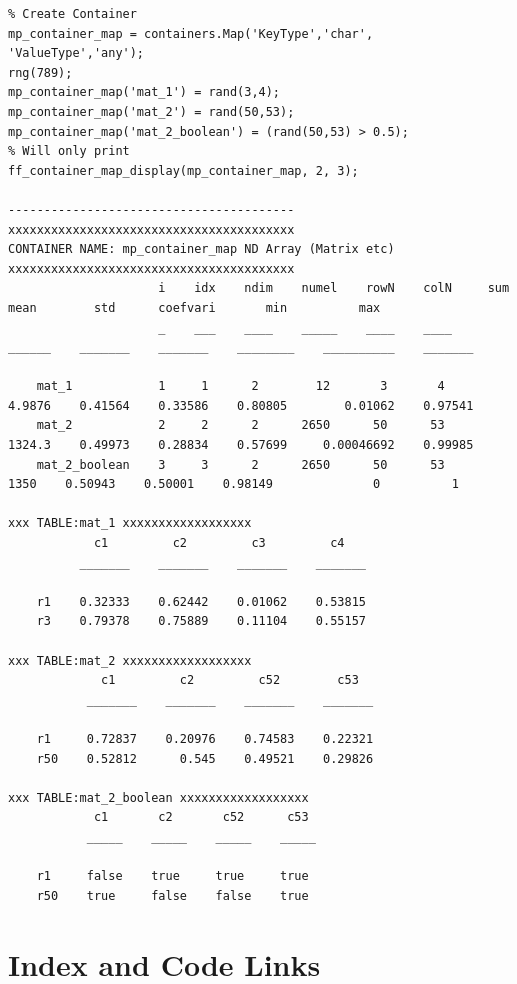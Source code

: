 \documentclass[
]{book}
\begin{document}
\begin{verbatim}
% Create Container
mp_container_map = containers.Map('KeyType','char', 'ValueType','any');
rng(789);
mp_container_map('mat_1') = rand(3,4);
mp_container_map('mat_2') = rand(50,53);
mp_container_map('mat_2_boolean') = (rand(50,53) > 0.5);
% Will only print 
ff_container_map_display(mp_container_map, 2, 3);

----------------------------------------
xxxxxxxxxxxxxxxxxxxxxxxxxxxxxxxxxxxxxxxx
CONTAINER NAME: mp_container_map ND Array (Matrix etc)
xxxxxxxxxxxxxxxxxxxxxxxxxxxxxxxxxxxxxxxx
                     i    idx    ndim    numel    rowN    colN     sum       mean        std      coefvari       min          max  
                     _    ___    ____    _____    ____    ____    ______    _______    _______    ________    __________    _______

    mat_1            1     1      2        12       3       4     4.9876    0.41564    0.33586    0.80805        0.01062    0.97541
    mat_2            2     2      2      2650      50      53     1324.3    0.49973    0.28834    0.57699     0.00046692    0.99985
    mat_2_boolean    3     3      2      2650      50      53       1350    0.50943    0.50001    0.98149              0          1

xxx TABLE:mat_1 xxxxxxxxxxxxxxxxxx
            c1         c2         c3         c4   
          _______    _______    _______    _______

    r1    0.32333    0.62442    0.01062    0.53815
    r3    0.79378    0.75889    0.11104    0.55157

xxx TABLE:mat_2 xxxxxxxxxxxxxxxxxx
             c1         c2         c52        c53  
           _______    _______    _______    _______

    r1     0.72837    0.20976    0.74583    0.22321
    r50    0.52812      0.545    0.49521    0.29826

xxx TABLE:mat_2_boolean xxxxxxxxxxxxxxxxxx
            c1       c2       c52      c53 
           _____    _____    _____    _____

    r1     false    true     true     true 
    r50    true     false    false    true
\end{verbatim}

\hypertarget{appendix-appendix}{%
\appendix}


\hypertarget{index-and-code-links}{%
\chapter{Index and Code Links}\label{index-and-code-links}}
\end{document}
